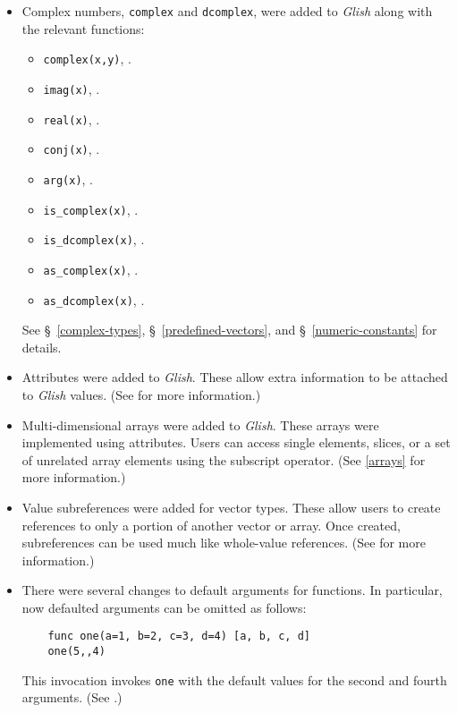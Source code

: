 \begin{itemize}

\item Complex numbers, \texttt{complex} and \texttt{dcomplex}, were added to
\emph{Glish} along with the relevant functions:
\begin{itemize}
\item \texttt{complex(x,y)}, .
\item \texttt{imag(x)}, .
\item \texttt{real(x)}, .
\item \texttt{conj(x)}, .
\item \texttt{arg(x)}, .
\item \texttt{is\_complex(x)}, .
\item \texttt{is\_dcomplex(x)}, .
\item \texttt{as\_complex(x)}, .
\item \texttt{as\_dcomplex(x)}, .
\end{itemize}
See \S~\ref{complex-types}, \S~\ref{predefined-vectors}, and 
\S~\ref{numeric-constants} for details.

\item Attributes were added to \emph{Glish}. These allow extra information
to be attached to \emph{Glish} values. (See  for more
information.)

\item Multi-dimensional arrays were added to \emph{Glish}. These arrays 
were implemented using attributes. Users can access single elements,
slices, or a set of unrelated array elements using the
subscript operator. (See \ref{arrays} for more information.)

\item Value subreferences were added for vector types. These
allow users to create references to only a portion of
another vector or array. Once created, subreferences can
be used much like whole-value references. 
(See  for more information.)

\item There were several changes to default arguments for functions.
In particular, now defaulted arguments can be omitted as follows:
\begin{verbatim}
    func one(a=1, b=2, c=3, d=4) [a, b, c, d]
    one(5,,4)
\end{verbatim}
This invocation invokes \texttt{one} with the default values for the 
second and fourth arguments.  (See .)


\end{itemize}
